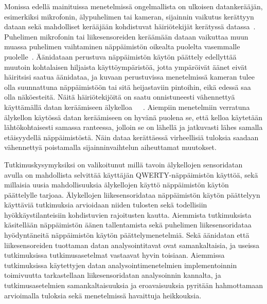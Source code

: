 \documentclass[finnish]{tktltiki2}
\theoremstyle{definition}
\theoremstyle{remark}
\begin{document}
Monissa edellä mainituissa menetelmissä ongelmallista on ulkoisen datankerääjän, esimerkiksi mikrofonin, älypuhelimen tai kameran, sijainnin vaikutus kerättyyn dataan sekä mahdolliset kerääjään kohdistuvat häiriötekijät kerätyssä datassa~\cite{berger}. Puhelimen mikrofonin tai liikesensoreiden keräämään dataan vaikuttaa muun muassa puhelimen vaihtaminen näppäimistön oikealta puolelta vasemmalle puolelle~\cite{mar}. Äänidataan perustuva näppäimistön käytön päättely edellyttää muutoin kohtalaisen hiljaista käyttöympäristöä, jotta ympäröivät äänet eivät häiritsisi saatua äänidataa, ja kuvaan perustuvissa menetelmissä kameran tulee olla suunnattuna näppäimistöön tai sitä heijastaviin pintoihin, eikä edessä saa olla näköesteitä. Näitä häiriötekijöitä on saatu onnistuneesti vähennettyä käyttämällä datan keräämiseen älykelloa~\cite{liu}~\cite{maiti}~\cite{mole}. Aiempiin menetelmiin verratuna älykellon käytössä datan keräämiseen on hyvänä puolena se, että kelloa käytetään lähtökohtaisesti samassa ranteessa, jolloin se on lähellä ja jatkuvasti lähes samalla etäisyydellä näppäimistöstä. Näin dataa kerättäessä virheellisiä tuloksia saadaan vähennettyä poistamalla sijainninvaihtelun aiheuttamat muutokset. 

Tutkimuskysymyksiksi on valikoitunut millä tavoin älykellojen sensoridatan avulla on mahdollista selvittää käyttäjän QWERTY-näppäimistön käyttöä, sekä millaisia uusia mahdollisuuksia älykellojen käyttö näppäimistön käytön päättelylle tarjoaa. Älykellojen liikesensoridataa näppäimistön käytön päättelyyn käyttäviä tutkimuksia arvioidaan niiden tulosten sekä todellisiin hyökkäystilanteisiin kohdistuvien rajoitusten kautta. Aiemmista tutkimuksista käsitellään näppäimistön äänen tallentamista sekä puhelimen liikesensoridataa hyödyntäneitä näppäimistön käytön päättelymenetelmiä. Sekä äänidatan että liikesensoreiden tuottaman datan analysointitavat ovat samankaltaisia, ja useissa tutkimuksissa tutkimusasetelmat vastaavat hyvin toisiaan. Aiemmissa tutkimuksissa käytettyjen datan analysointimenetelmien implementoinnin toimivuutta tarkastellaan liikesensoridatan analysoinnin kannalta, ja tutkimusasetelmien samankaltaisuuksia ja eroavaisuuksia pyritään hahmottamaan arvioimalla tuloksia sekä menetelmissä havaittuja heikkouksia.


\pagebreak
\end{document}
